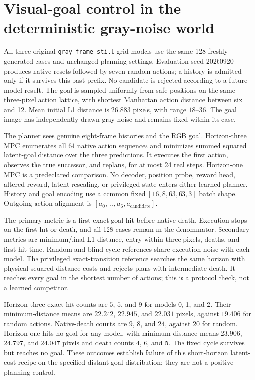 \section{Visual-goal control in the deterministic gray-noise world}
\label{app:redcube-goals}

All three original \texttt{gray\_frame\_still} grid models use the same 128 freshly generated cases
and unchanged planning settings. Evaluation seed 20260920 produces native resets followed by seven
random actions; a history is admitted only if it survives this past prefix. No candidate is rejected
according to a future model result. The goal is sampled uniformly from safe positions on the same
three-pixel action lattice, with shortest Manhattan action distance between six and 12. Mean initial
L1 distance is $26.883$ pixels, with range $18$--$36$. The goal image has independently drawn gray
noise and remains fixed within its case.

The planner sees genuine eight-frame histories and the RGB goal. Horizon-three MPC enumerates all
64 native action sequences and minimizes summed squared latent-goal distance over the three
predictions. It executes the first action, observes the true successor, and replans, for at most
24 real steps. Horizon-one MPC is a predeclared comparison. No decoder, position probe, reward
head, altered reward, latent rescaling, or privileged state enters either learned planner. History
and goal encoding use a common fixed $[16,8,63,63,3]$ batch shape. Outgoing action alignment is
$[a_0,\ldots,a_6,a_{\mathrm{candidate}}]$.

The primary metric is a first exact goal hit before native death. Execution stops on the first hit
or death, and all 128 cases remain in the denominator. Secondary metrics are minimum/final L1
distance, entry within three pixels, deaths, and first-hit time. Random and blind-cycle references
share execution noise with each model. The privileged exact-transition reference searches the same
horizon with physical squared-distance costs and rejects plans with intermediate death. It reaches
every goal in the shortest number of actions; this is a protocol check, not a learned competitor.

Horizon-three exact-hit counts are $5$, $5$, and $9$ for models 0, 1, and 2. Their minimum-distance
means are $22.242$, $22.945$, and $22.031$ pixels, against $19.406$ for random actions. Native-death
counts are $9$, $8$, and $24$, against $20$ for random. Horizon-one hits no goal for any model,
with minimum-distance means $23.906$, $24.797$, and $24.047$ pixels and death counts $4$, $6$, and
$5$. The fixed cycle survives but reaches no goal. These outcomes establish failure of this
short-horizon latent-cost recipe on the specified distant-goal distribution; they are not a
positive planning control.

